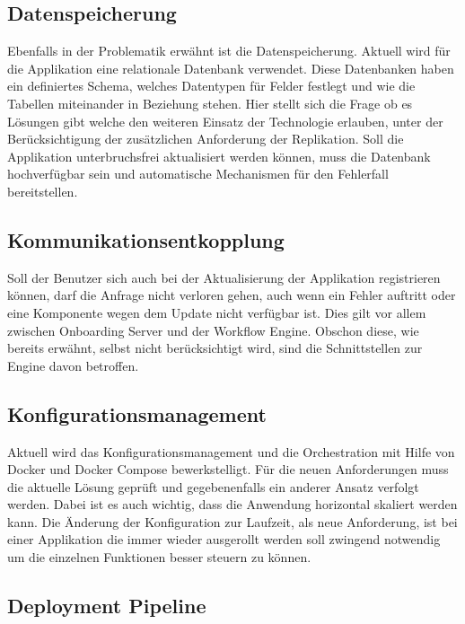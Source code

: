 \subsection{Datenspeicherung}

Ebenfalls in der Problematik erwähnt ist die Datenspeicherung. Aktuell wird für die Applikation eine relationale Datenbank verwendet. Diese Datenbanken haben ein definiertes Schema, welches Datentypen für Felder festlegt und wie die Tabellen miteinander in Beziehung stehen. Hier stellt sich die Frage ob es Lösungen gibt welche den weiteren Einsatz der Technologie erlauben, unter der Berücksichtigung der zusätzlichen Anforderung der Replikation. Soll die Applikation unterbruchsfrei aktualisiert werden können, muss die Datenbank hochverfügbar sein und automatische Mechanismen für den Fehlerfall bereitstellen.

\subsection{Kommunikationsentkopplung}

Soll der Benutzer sich auch bei der Aktualisierung der Applikation registrieren können, darf die Anfrage nicht verloren gehen, auch wenn ein Fehler auftritt oder eine Komponente wegen dem Update nicht verfügbar ist. Dies gilt vor allem zwischen Onboarding Server und der Workflow Engine. Obschon diese, wie bereits erwähnt, selbst nicht berücksichtigt wird, sind die Schnittstellen zur Engine davon betroffen.

\subsection{Konfigurationsmanagement}

Aktuell wird das Konfigurationsmanagement und die Orchestration mit Hilfe von Docker und Docker Compose bewerkstelligt. Für die neuen Anforderungen muss die aktuelle Lösung geprüft und gegebenenfalls ein anderer Ansatz verfolgt werden. Dabei ist es auch wichtig, dass die Anwendung horizontal skaliert werden kann. Die Änderung der Konfiguration zur Laufzeit, als neue Anforderung, ist bei einer Applikation die immer wieder ausgerollt werden soll zwingend notwendig um die einzelnen Funktionen besser steuern zu können.

\subsection{Deployment Pipeline}

